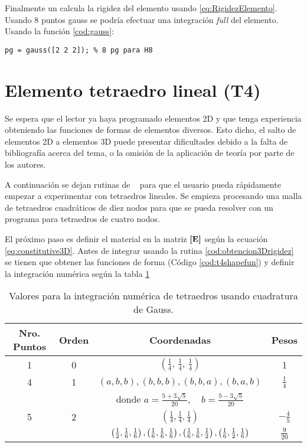 Finalmente un calcula la rigidez del elemento usando \eqref{eq:RigidezElemento}. Usando 8 puntos gauss se podría efectuar una integración \textit{full} del elemento. Usando la función \ref{cod:gauss}:
\begin{lstlisting}
pg = gauss([2 2 2]); % 8 pg para H8 
\end{lstlisting}

\section{Elemento tetraedro lineal (T4)}
Se espera que el lector ya haya programado elementos 2D y que tenga experiencia obteniendo las funciones de formas de elementos diversos. Esto dicho, el salto de elementos 2D a elementos 3D puede presentar dificultades debido a la falta de bibliografía acerca del tema, o la omisión de la aplicación de teoría por parte de los autores.

A continuación se dejan rutinas de \Matlab~ para que el usuario pueda rápidamente empezar a experimentar con tetraedros lineales. Se empieza procesando una malla de tetraedros cuadráticos de diez nodos para que se pueda resolver con un programa para tetraedros de cuatro nodos.



El próximo paso es definir el material en la matriz $\boldsymbol{[}\mathbf{E} \boldsymbol{]}$ según la ecuación \eqref{eq:constitutive3D}. Antes de integrar usando la rutina \ref{cod:obtencion3Drigidez} se tienen que obtener las funciones de forma (Código \ref{cod:t4shapefun}) y definir la integración numérica según la tabla \ref{tab:gausstetraedros}




\begin{table}[htb!]
	\centering
	\begin{tabular}{cccc}
		Nro. Puntos & Orden & Coordenadas & Pesos \\ \hline \hline
		1 & 0 & \( \left(\frac{1}{4}, \,\frac{1}{4}, \, \frac{1}{4} \right)\) & 1 \\ [1pt] \hline
		4 & 1 & \(  (a,b,b), (b,b,b), (b,b,a), (b,a,b) \) & \( \frac{1}{4}\) \\ [2pt]
		&   &donde    \( a = \frac{5+3\sqrt{5}}{20}, \quad b =\frac{5-3\sqrt{5}}{20} \) & \\[2pt] \hline 
		5 & 2 & \( \left(\frac{1}{4}, \frac{1}{4}, \frac{1}{4} \right)\) & \( -\frac{4}{5}\)   \\[5pt]
		&   &  \( \left(\frac{1}{2},\frac{1}{6}, \frac{1}{6} \right), \left(\frac{1}{6},\frac{1}{6}, \frac{1}{6} \right), \left(\frac{1}{6},\frac{1}{6}, \frac{1}{2} \right), \left(\frac{1}{6},\frac{1}{2}, \frac{1}{6} \right) \) & \(\frac{9}{20}\)
	\end{tabular}
	\caption{Valores para la integración numérica de tetraedros usando cuadratura de Gauss.}
	\label{tab:gausstetraedros}
\end{table}

